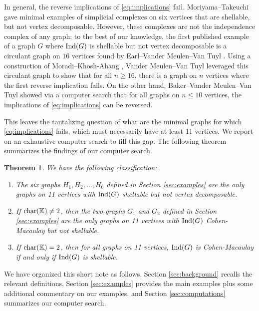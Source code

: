 \documentclass[12pt]{amsart}
\theoremstyle{plain}
\newtheorem{theorem}{Theorem}[section]
\theoremstyle{definition}
\theoremstyle{remark}
\numberwithin{equation}{section}
\numberwithin{equation}{section}
\begin{document}
In general, the reverse implications of \eqref{eq:implications} fail.
Moriyama--Takeuchi \cite{MT2003} gave minimal examples of simplicial complexes
on six vertices that are shellable, but not vertex decomposable. However,
these complexes are not the independence complex of any graph;
to the best of our knowledge, the first published example
of a graph $G$ where ${\rm Ind}(G)$ is shellable but not vertex decomposable
is a circulant graph on $16$ vertices found by Earl--Vander Meulen--Van Tuyl \cite{EVMVT2016}.  Using a construction of Moradi--Khosh-Ahang \cite{MKA2016},
Vander Meulen--Van Tuyl \cite{VMVT2017}  leveraged this circulant graph to show that for all $n \geq 16$, there is
a graph on $n$ vertices where the first reverse implication fails. On the 
other hand, Baker--Vander Meulen--Van Tuyl \cite{BVMVT2018} showed via
a computer search that
for all graphs on $n \leq 10$ vertices, 
the implications
of \eqref{eq:implications} can be reversed. 

This leaves the tantalizing question of what are the minimal graphs
for  which \eqref{eq:implications} fails, which must necessarily have
at least 11 vertices. We report on an exhaustive computer
search to fill this gap. 
The following theorem summarizes the findings of our computer
search. 

\begin{theorem}\label{thm:maintheorem}
We have the following classification:
\begin{enumerate}
    \item The six graphs $H_1,H_2,\ldots,H_6$ defined in Section \ref{sec:examples} are the only graphs on 11 vertices with
    ${\rm Ind}(G)$ shellable but not vertex decomposable.
    \item If ${\rm char}(\mathbb{K}) \neq 2$, then the two graphs $G_1$ and $G_2$
    defined in Section \ref{sec:examples} are the only graphs
    on 11 vertices with ${\rm Ind}(G)$ Cohen-Macaulay but not shellable.
    \item If ${\rm char}(\mathbb{K}) =2$, then for all graphs on 11
    vertices, ${\rm Ind}(G)$ is Cohen-Macaulay
    if and only if ${\rm Ind}(G)$ is shellable.
\end{enumerate}
\end{theorem}

We have organized this short note as follows. Section \ref{sec:background}
recalls the relevant definitions, Section \ref{sec:examples} provides
the main examples plus some additional commentary on our examples, and Section \ref{sec:computations}  summarizes 
our computer search.
\end{document}

